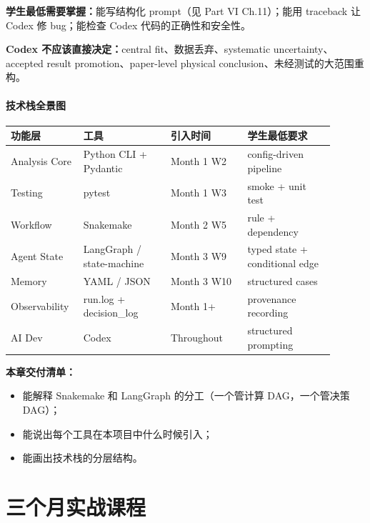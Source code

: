 \documentclass[11pt,a4paper,fontset=fandol]{ctexart}
\begin{document}
\textbf{学生最低需要掌握：}能写结构化 prompt（见 Part VI Ch.11）；能用 traceback 让 Codex 修 bug；能检查 Codex 代码的正确性和安全性。

\textbf{Codex 不应该直接决定：}central fit、数据丢弃、systematic uncertainty、accepted result promotion、paper-level physical conclusion、未经测试的大范围重构。

\subsection{技术栈全景图}

\begin{center}
\begin{tabular}{p{0.18\linewidth}p{0.25\linewidth}p{0.22\linewidth}p{0.25\linewidth}}
\toprule
功能层 & 工具 & 引入时间 & 学生最低要求 \\
\midrule
Analysis Core & Python CLI + Pydantic & Month 1 W2 & config-driven pipeline \\
Testing & pytest & Month 1 W3 & smoke + unit test \\
Workflow & Snakemake & Month 2 W5 & rule + dependency \\
Agent State & LangGraph / state-machine & Month 3 W9 & typed state + conditional edge \\
Memory & YAML / JSON & Month 3 W10 & structured cases \\
Observability & run.log + decision\_log & Month 1+ & provenance recording \\
AI Dev & Codex & Throughout & structured prompting \\
\bottomrule
\end{tabular}
\end{center}

\textbf{本章交付清单：}
\begin{itemize}
  \item 能解释 Snakemake 和 LangGraph 的分工（一个管计算 DAG，一个管决策 DAG）；
  \item 能说出每个工具在本项目中什么时候引入；
  \item 能画出技术栈的分层结构。
\end{itemize}

\newpage
\part{三个月实战课程}
\end{document}
